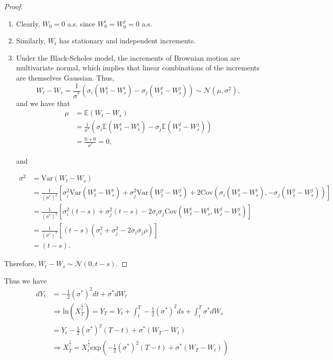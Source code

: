 \documentclass{article}
\theoremstyle{definition}
\begin{document}
\begin{proof}
    \begin{enumerate}
        \item Clearly, \( W_0 = 0 \) a.s. since \( W_0^i = W_0^j = 0 \) a.s.
        
        \item Similarly, \( W_t \) has stationary and independent increments.
        
        \item Under the Black-Scholes model, the increments of Brownian motion are multivariate normal, which implies that linear combinations of the increments are themselves Gaussian. Thus,
        \[
        W_t - W_s = \frac{1}{\sigma^*} \left( \sigma_i(W_t^i - W_s^i) - \sigma_j(W_t^j - W_s^j) \right) \sim \mathcal{N}(\mu, \sigma^2),
        \]
        and we have that
        \begin{align}
            \mu &= \mathbb{E}(W_t - W_s) \nonumber \\
            &= \frac{1}{\sigma^*} \left( \sigma_i \mathbb{E}(W_t^i - W_s^i) - \sigma_j \mathbb{E}(W_t^j - W_s^j) \right) \nonumber \\
            &= \frac{0 + 0}{\sigma^*} = 0, \label{eq:mean}
        \end{align}
        
        and
        
        \begin{align}
            \sigma^2 &= \text{Var}(W_t - W_s) \nonumber \\
            &= \frac{1}{(\sigma^*)^2} \left[ \sigma_i^2 \text{Var}(W_t^i - W_s^i) + \sigma_j^2 \text{Var}(W_t^j - W_s^j) + 2 \text{Cov}\left( \sigma_i (W_t^i - W_s^i), -\sigma_j (W_t^j - W_s^j) \right) \right] \nonumber \\
            &= \frac{1}{(\sigma^*)^2} \left[ \sigma_i^2 (t-s) + \sigma_j^2 (t-s) - 2 \sigma_i \sigma_j \text{Cov}(W_t^i - W_s^i, W_t^j - W_s^j) \right] \nonumber \\
            &= \frac{1}{(\sigma^*)^2} \left[ (t-s)(\sigma_i^2 + \sigma_j^2 - 2 \sigma_i \sigma_j \rho) \right] \nonumber \\
            &= (t-s). \label{eq:variance}
        \end{align}
    \end{enumerate}
    
    Therefore, \( W_t - W_s \sim \mathcal{N}(0, t-s) \).
\end{proof}
\noindent
Thus we have 
\begin{align}
    dY_t &= -\frac{1}{2}(\sigma^*)^2dt + \sigma^*dW_t\\
    &\Rightarrow \text{ln}(X_T^{\frac{i}{j}}) = Y_T = Y_t + \int_{t}^{T}-\frac{1}{2}(\sigma^*)^2 ds + \int_{t}^{T}\sigma^*dW_s\\
    &=Y_t -\frac{1}{2}(\sigma^*)^2(T-t) + \sigma^*(W_T-W_t)\\
    &\Rightarrow X_T^{\frac{i}{j}} = X_t^{\frac{i}{j}}\text{exp}\left(-\frac{1}{2}(\sigma^*)^2(T-t) + \sigma^*(W_T-W_t)\right)
\end{align}
\end{document}

